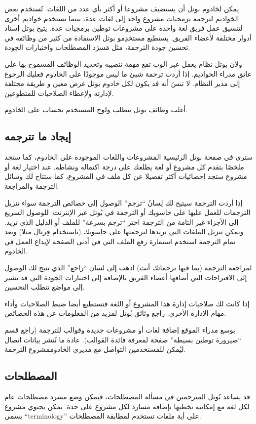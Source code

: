 يمكن لخادوم بوتل أن يستضيف مشروعا أو أكثر بأي عدد من اللغات. تُستخدم بعض
الخواديم لترجمة برمجيات مشروع واحد إلى لغات عدة، بينما تستخدم خواديم
أخرى لتنسيق عمل فريق لغة واحدة على مشروعات توطين برمجيات عدة. يتيح بوتل
إسناد أدوار مختلفة لأعضاء الفريق. يستطيع مستخدِمو بوتل الاستفادة من
كثير من وظائفه في تحسين جودة الترجمة، مثل مَسرَد المصطلحات واختبارات
الجودة.

ولأن بوتل نظام يعمل عبر الوب تقع مهمة تنصيبه وتحديد الوظائف المسموح بها
على عاتق مدراء الخواديم. إذا أردت ترجمة شيئ ما ليس موجودًا على الخادوم
فعليك الرجوع إلى مدير النظام. لا تنسَ أنه قد يكون لكل خادوم بوتل غرض
معين و طريقة مختلفة لإدارته ولإعطاء الصلاحيات للمتطوعين.

أغلب وظائف بوتل تتطلب ولوج المستخدم بحساب على الخادوم.

\subsection{إيجاد ما تترجمه}
سترى في صفحة بوتل الرئيسية المشروعات واللغات الموجودة على الخادوم، كما
ستجد ملخصًا بتقدم كل مشروع أو لغة يطلعك على درجة اكتماله ونشاطه. عند
اختيار لغة أو مشروع ستجد إحصائيات أكثر تفصيلا عن كل ملف في المشروع، كما
ستتاح لك وسائل الترجمة والمراجعة.

إذا أردت الترجمة سيتيح لك لِسانُ “ترجم” الوصول إلى خصائص الترجمة سواء
تنزيل الترجمات للعمل عليها على حاسوبك أو الترجمة في بُوتل عبر الإنترنت.
للوصول السريع إلى الأجزاء غير التامة من الترجمة اختر “ترجم بسرعة” للملف
أو الدليل الذي تريد. ويمكن تنزيل الملفات التي تريدها لترجمتها على
حاسوبك (باستخدام فِرتال مثلا) وبعد تمام الترجمة استخدم استمارة رفع
الملف التي في أدنى الصفحة لإيداع العمل في الخادوم.

لمراجعة الترجمة (بما فيها ترجماتك أنت) اذهب إلى لسان “راجع” الذي يتيح لك
الوصول إلى الاقتراحات التي أضافها أعضاء الفريق بالإضافة إلى اختبارات
الجودة التي قد تشير إلى مواضع تتطلب التحسين.

إذا كانت لك صلاحيات إدارة هذا المشروع أو اللغة فتستطيع أيضا ضبط
الصلاحيات وأداء مهام الإدارة الأخرى. راجع وثائق بُوتل لمزيد من
المعلومات عن هذه الخصائص.

بوسع مدراء الموقع إضافة لغات أو مشروعات جديدة وقوالب للترجمة (راجع قسم
“صيرورة توطين بسيطة” صفحة  لمعرفة فائدة
القوالب). عادة ما تُنشر بيانات اتصال ليُمكن للمستخدمين التواصل مع مديري
الخادوم مشروع الترجمة.

\subsection{المصطلحات}
قد يساعد بُوتل المترجمين في مسألة
المصطلحات، فيمكن وضع مسرد مصطلحات عام لكل لغة مع إمكانية تخطيها بإضافة
مسارد لكل مشروع على حدة. يمكن يحتوي مشروع يسمى “terminology” على أية
ملفات تستخدم لمطابقة المصطلحات.

